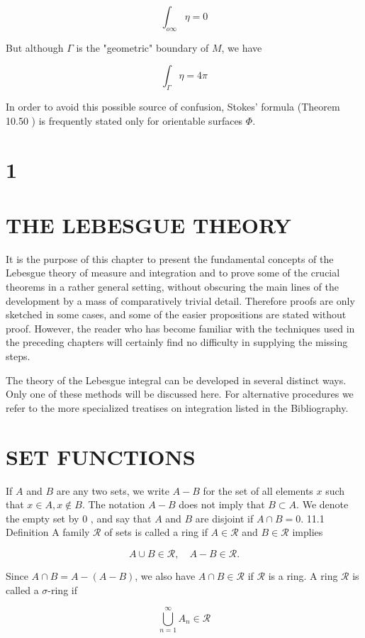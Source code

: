 \documentclass[10pt]{article}
\begin{document}
$$
\int_{o \infty} \eta=0
$$

But although $\Gamma$ is the "geometric" boundary of $M$, we have

$$
\int_{\Gamma} \eta=4 \pi
$$

In order to avoid this possible source of confusion, Stokes' formula (Theorem 10.50 ) is frequently stated only for orientable surfaces $\Phi$.

\section{1}
\section{THE LEBESGUE THEORY}
It is the purpose of this chapter to present the fundamental concepts of the Lebesgue theory of measure and integration and to prove some of the crucial theorems in a rather general setting, without obscuring the main lines of the development by a mass of comparatively trivial detail. Therefore proofs are only sketched in some cases, and some of the easier propositions are stated without proof. However, the reader who has become familiar with the techniques used in the preceding chapters will certainly find no difficulty in supplying the missing steps.

The theory of the Lebesgue integral can be developed in several distinct ways. Only one of these methods will be discussed here. For alternative procedures we refer to the more specialized treatises on integration listed in the Bibliography.

\section{SET FUNCTIONS}
If $A$ and $B$ are any two sets, we write $A-B$ for the set of all elements $x$ such that $x \in A, x \notin B$. The notation $A-B$ does not imply that $B \subset A$. We denote the empty set by 0 , and say that $A$ and $B$ are disjoint if $A \cap B=0$. 11.1 Definition A family $\mathscr{R}$ of sets is called a ring if $A \in \mathscr{R}$ and $B \in \mathscr{R}$ implies

$$
A \cup B \in \mathscr{R}, \quad A-B \in \mathscr{R} .
$$

Since $A \cap B=A-(A-B)$, we also have $A \cap B \in \mathscr{R}$ if $\mathscr{R}$ is a ring. A ring $\mathscr{R}$ is called a $\sigma$-ring if

$$
\bigcup_{n=1}^{\infty} A_{n} \in \mathscr{R}
$$
\end{document}
